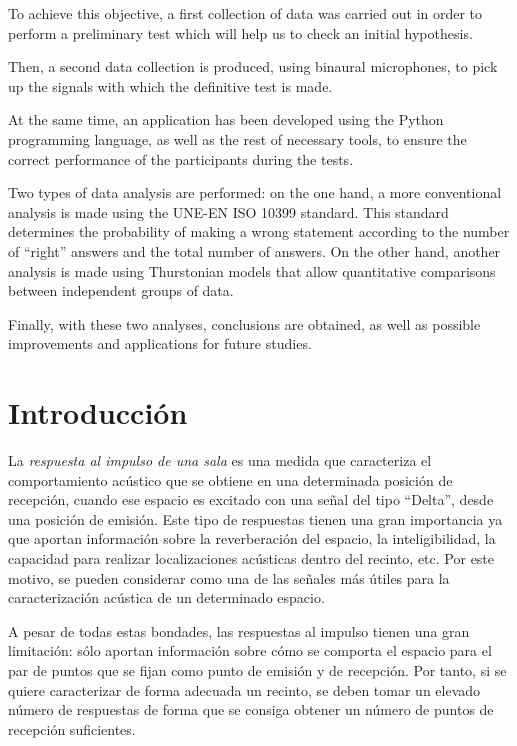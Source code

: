 \documentclass[11pt,a4paper]{book}
\begin{document}
    To achieve this objective, a first collection of data was carried out in order to perform a preliminary test which will help us to check an initial hypothesis. 

    Then, a second data collection is produced, using binaural microphones, to pick up the signals with which the definitive test is made.

    At the same time, an application has been developed using the Python programming language, as well as the rest of necessary tools, to ensure the correct performance of the participants during the tests.

    Two types of data analysis are performed: on the one hand, a more conventional analysis is made using the UNE-EN ISO 10399 standard. This standard determines the probability of making a wrong statement according to the number of ``right'' answers and the total number of answers. On the other hand, another analysis is made using Thurstonian models that allow quantitative comparisons between independent groups of data.

    Finally, with these two analyses, conclusions are obtained, as well as possible improvements and applications for future studies.

\tableofcontents
\listoffigures
\listoftables
\chapter{Introducción}
    La \textit{respuesta al impulso de una sala} es una medida que caracteriza el comportamiento acústico que se obtiene en una determinada posición de recepción, cuando ese espacio es excitado con una señal del tipo ``Delta'', desde una posición de emisión. Este tipo de respuestas tienen una gran importancia ya que aportan información sobre la reverberación del espacio, la inteligibilidad, la capacidad para realizar localizaciones acústicas dentro del recinto, etc. Por este motivo, se pueden considerar como una de las señales más útiles para la caracterización acústica de un determinado espacio. 
    
    A pesar de todas estas bondades, las respuestas al impulso tienen una gran limitación: sólo aportan información sobre cómo se comporta el espacio para el par de puntos que se fijan como punto de emisión y de recepción. Por tanto, si se quiere caracterizar de forma adecuada un recinto, se deben tomar un elevado número de respuestas de forma que se consiga obtener un número de puntos de recepción suficientes.
    
\end{document}
